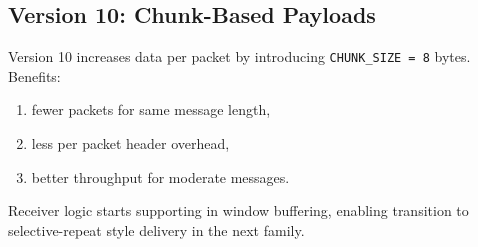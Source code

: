 
\clearpage
\subsection{Version 10: Chunk-Based Payloads}
Version 10 increases data per packet by introducing \texttt{CHUNK\_SIZE = 8}
bytes. Benefits:

\begin{enumerate}
    \item fewer packets for same message length,
    \item less per packet header overhead,
    \item better throughput for moderate messages.
\end{enumerate}

Receiver logic starts supporting in window buffering, enabling transition to
selective-repeat style delivery in the next family.

